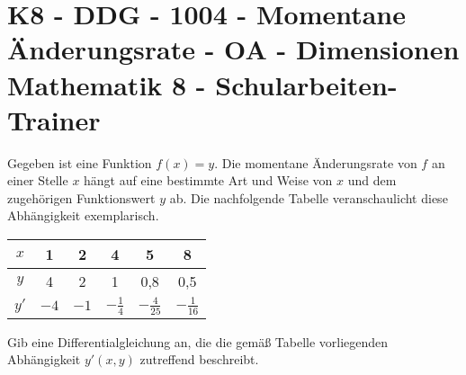 \section{K8 - DDG - 1004 - Momentane Änderungsrate - OA - Dimensionen Mathematik 8 - Schularbeiten-Trainer}

\begin{beispiel}[K8 - DDG]{1}
Gegeben ist eine Funktion $f(x)=y$. Die momentane Änderungsrate von $f$ an einer Stelle $x$ hängt auf eine bestimmte Art und Weise von $x$ und dem zugehörigen Funktionswert $y$ ab. Die nachfolgende Tabelle veranschaulicht diese Abhängigkeit exemplarisch.
\begin{center}
	\begin{tabular}{|c|c|c|c|c|c|}\hline
	\cellcolor[gray]{0.9}$x$&1&2&4&5&8\\ \hline
	\cellcolor[gray]{0.9}$y$&4&2&1&0,8&0,5\\ \hline
	\cellcolor[gray]{0.9}$y'$&$-4$&$-1$&$-\frac{1}{4}$&$-\frac{4}{25}$&$-\frac{1}{16}$\\ \hline
	\end{tabular}
\end{center}

Gib eine Differentialgleichung an, die die gemäß Tabelle vorliegenden Abhängigkeit $y'(x,y)$ zutreffend beschreibt.

\end{beispiel}